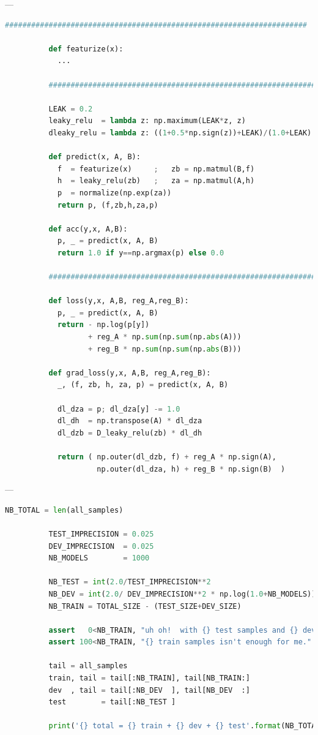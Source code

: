 \documentclass[11pt, justified]{tufte-book}
\newcommand{\samsubsubsection}[1]{
   \vspace{0.1cm}
   \par\noindent{\hspace{-2cm}\normalsize \sc \gre #1} ---
}
\theoremstyle{definition}
\begin{document}
      \samsubsubsection{architecture}
        \begin{lstlisting}[language=Python, basicstyle=\footnotesize\ttfamily]
          #####################################################################

          def featurize(x):
            ...

          #####################################################################

          LEAK = 0.2
          leaky_relu  = lambda z: np.maximum(LEAK*z, z)
          dleaky_relu = lambda z: ((1+0.5*np.sign(z))+LEAK)/(1.0+LEAK)

          def predict(x, A, B):
            f  = featurize(x)     ;   zb = np.matmul(B,f)
            h  = leaky_relu(zb)   ;   za = np.matmul(A,h)
            p  = normalize(np.exp(za))
            return p, (f,zb,h,za,p)

          def acc(y,x, A,B):
            p, _ = predict(x, A, B)
            return 1.0 if y==np.argmax(p) else 0.0  

          #####################################################################

          def loss(y,x, A,B, reg_A,reg_B):
            p, _ = predict(x, A, B)
            return - np.log(p[y])
                   + reg_A * np.sum(np.sum(np.abs(A))) 
                   + reg_B * np.sum(np.sum(np.abs(B))) 

          def grad_loss(y,x, A,B, reg_A,reg_B):
            _, (f, zb, h, za, p) = predict(x, A, B)

            dl_dza = p; dl_dza[y] -= 1.0
            dl_dh  = np.transpose(A) * dl_dza 
            dl_dzb = D_leaky_relu(zb) * dl_dh 

            return ( np.outer(dl_dzb, f) + reg_A * np.sign(A),
                     np.outer(dl_dza, h) + reg_B * np.sign(B)  )
        \end{lstlisting}

      \newpage
      \samsubsubsection{splitting}
        \begin{lstlisting}[language=Python, basicstyle=\footnotesize\ttfamily]
          NB_TOTAL = len(all_samples)

          TEST_IMPRECISION = 0.025 
          DEV_IMPRECISION  = 0.025
          NB_MODELS        = 1000

          NB_TEST = int(2.0/TEST_IMPRECISION**2                        )
          NB_DEV = int(2.0/ DEV_IMPRECISION**2 * np.log(1.0+NB_MODELS))
          NB_TRAIN = TOTAL_SIZE - (TEST_SIZE+DEV_SIZE)

          assert   0<NB_TRAIN, "uh oh!  with {} test samples and {} dev samples we'll have no train samples!".format(NB_TEST, NB_DEV) 
          assert 100<NB_TRAIN, "{} train samples isn't enough for me.".format(NB_TRAIN) 

          tail = all_samples 
          train, tail = tail[:NB_TRAIN], tail[NB_TRAIN:] 
          dev  , tail = tail[:NB_DEV  ], tail[NB_DEV  :] 
          test        = tail[:NB_TEST ]

          print('{} total = {} train + {} dev + {} test'.format(NB_TOTAL, NB_TRAIN, NB_DEV, NB_TEST))
        \end{lstlisting}
\end{document}
